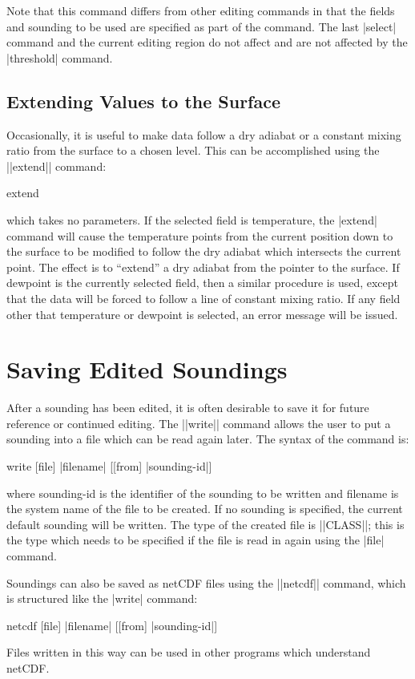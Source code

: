 Note that this command differs from other editing commands in that the fields
and sounding to be used are specified as part of the command.  The last 
|select| command and the current editing region do not affect and are not
affected by the |threshold| command.

\subsection{Extending Values to the Surface}
Occasionally, it is useful to make data follow a dry adiabat or a constant
mixing ratio from the surface to a chosen level.  This can be accomplished
using the ||extend|| command:
\begin{example}
	extend
\end{example}
which takes no parameters.  If the selected field is temperature, the
|extend| command will cause the temperature points from the current
position down to the surface to be modified to follow the dry adiabat which
intersects the current point.  The effect is to ``extend'' a dry adiabat
from the pointer to the surface.  If dewpoint is the currently selected
field, then a similar procedure is used, except that the data will be
forced to follow a line of constant mixing ratio.  If any field other that
temperature or dewpoint is selected, an error message will be issued.

\section{Saving Edited Soundings}
After a sounding has been edited, it is often desirable to save it for future
reference or continued editing.  The ||write|| command allows the user
to put a sounding into a file which can be read again later.  The syntax of 
the command is:
\begin{example}
	write [file] |filename| [[from] |sounding-id|]
\end{example}
where {\pf sounding-id} is the identifier of the sounding to be
written and {\pf filename} is the system name of the file to be created.
If no sounding is specified, the current default sounding will be written.
The type of the created file is ||CLASS||; this is the type which needs
to be specified if the file is read in again using the |file| command.

Soundings can also be saved as netCDF files using the ||netcdf|| command,
which is structured like the |write| command:
\begin{example}
	netcdf [file] |filename| [[from] |sounding-id|]
\end{example}
Files written in this way can be used in other programs which understand
netCDF.

